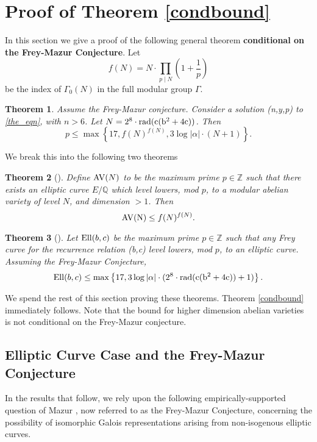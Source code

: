 \documentclass[12pt]{amsart}
\newtheorem{thm}{Theorem}[section]
\theoremstyle{definition}
\def\Q{{\mathbb Q}}
\def\Z{{\mathbb Z}}
\newcommand{\rad}{\rm rad}
\newcommand{\Ell}{\rm{Ell}}
\newcommand{\AV}{\rm{AV}}
\begin{document}
\section{Proof of Theorem \ref{condbound}}\label{genthmproof}

In this section we give a proof of the following general theorem \textbf{conditional on the Frey-Mazur Conjecture}.  Let 
\[f(N) = N \cdot \prod_{p \mid N} \left( 1 + \frac{1}{p} \right) \]
be the index of $\Gamma_0(N)$ in the full modular group $\Gamma$.

\begin{thm}\label{condbound_inplace}
Assume the Frey-Mazur conjecture.  Consider a solution (n,y,p) to \eqref{the_eqn}, with $n > 6$. Let $N = 2^8 \cdot \rad(c(b^2+4c))$. Then 
\[ p \leq \max\left\{17,   f(N)^{f(N)}, 3\log{|\alpha|} \cdot ( N+1)  \right\}. \]

\end{thm}

We break this into the following two theorems

\begin{thm}[]\label{bound_av}
Define ${\AV}(N)$ to be the maximum prime $p \in \Z$ such that there exists an elliptic curve $E/\Q$ which level lowers, mod $p$, to a modular abelian variety of level $N$, and dimension $> 1$.  Then
\[{\AV(N)} \leq f(N)^{f(N)}. \]
\end{thm}

\begin{thm}[]\label{bound_ell}
Let ${\Ell}(b,c)$ be the maximum prime $p \in \Z$ such that any Frey curve for the recurrence relation (b,c) level lowers, mod $p$, to an elliptic curve.  Assuming the Frey-Mazur Conjecture, 
\[{\Ell}(b,c) \leq \max\left\{17, 3\log{|\alpha|} \cdot (2^{8} \cdot \rad(c(b^2+4c))+1) \right\}. \]
\end{thm}


We spend the rest of this section proving these theorems. Theorem \ref{condbound} immediately follows.  Note that the bound for higher dimension abelian varieties is not conditional on the Frey-Mazur conjecture.



\subsection{Elliptic Curve Case and the Frey-Mazur Conjecture}

In the results that follow, we rely upon the following empirically-supported question of Mazur \cite{mazur78}, now referred to as the Frey-Mazur Conjecture, concerning the possibility of isomorphic Galois representations arising from non-isogenous elliptic curves.
\end{document}
